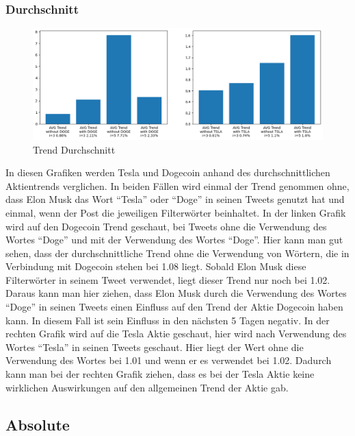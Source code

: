\documentclass{article}
\begin{document}
\subsubsection{Durchschnitt}
\begin{figure}[!htb]
  	\includegraphics[width=\textwidth, center]{./imgs/Trend_Durchschnitt.png}
 	\caption{Trend Durchschnitt}
 	\label{fig:Trend Durchschnitt}
\end{figure}
In diesen Grafiken werden Tesla und Dogecoin anhand des durchschnittlichen Aktientrends verglichen. In beiden Fällen wird einmal der Trend genommen ohne, dass Elon Musk das Wort ``Tesla'' oder ``Doge'' in seinen Tweets genutzt hat und einmal, wenn der Post die jeweiligen Filterwörter beinhaltet.
In der linken Grafik wird auf den Dogecoin Trend geschaut, bei Tweets ohne die Verwendung des Wortes ``Doge'' und mit der Verwendung des Wortes ``Doge''. Hier kann man gut sehen, dass der durchschnittliche Trend ohne die Verwendung von Wörtern, die in Verbindung mit Dogecoin stehen bei 1.08 liegt. Sobald Elon Musk diese Filterwörter in seinem Tweet verwendet, liegt dieser Trend nur noch bei 1.02.
Daraus kann man hier ziehen, dass Elon Musk durch die Verwendung des Wortes ``Doge'' in seinen Tweets einen Einfluss auf den Trend der Aktie Dogecoin haben kann. In diesem Fall ist sein Einfluss in den nächsten 5 Tagen negativ.
In der rechten Grafik wird auf die Tesla Aktie geschaut, hier wird nach Verwendung des Wortes ``Tesla'' in seinen Tweets geschaut. Hier liegt der Wert ohne die Verwendung des Wortes bei 1.01 und wenn er es verwendet bei 1.02.
Dadurch kann man bei der rechten Grafik ziehen, dass es bei der Tesla Aktie keine wirklichen Auswirkungen auf den allgemeinen Trend der Aktie gab.


\subsection{Absolute}
\end{document}
